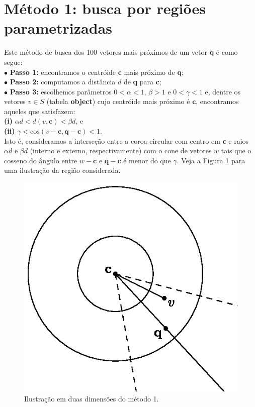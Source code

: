 \documentclass[a4paper,12pt,titlepage]{scrartcl}
\begin{document}
\section{Método 1: busca por regiões parametrizadas}

Este método de busca dos 100 vetores mais próximos de um vetor \textbf{q} é como segue:\\

\noindent$\bullet$ \textbf{Passo 1:} encontramos o centróide \textbf{c} mais próximo de \textbf{q};\\

\noindent$\bullet$ \textbf{Passo 2:} computamos a distância $d$ de \textbf{q} para \textbf{c};\\

\noindent$\bullet$ \textbf{Passo 3:} escolhemos parâmetros $0 < \alpha < 1$, $\beta > 1$ e $0 < \gamma < 1$ e, dentre os vetores $v \in S$ (tabela \textbf{object}) cujo centróide mais próximo é \textbf{c}, encontramos aqueles que satisfazem:\\

\noindent\textbf{(i)} $\alpha d < d(v,\mathbf{c}) < \beta d$, e \\

\noindent\textbf{(ii)} $\gamma < \mathrm{cos}(v-\mathbf{c},\mathbf{q}-\mathbf{c}) < 1$.\\

Isto é, consideramos a interseção entre a coroa circular com centro em \textbf{c} e raios $\alpha d$ e $\beta d$ (interno e externo, respectivamente) com o cone de vetores $w$ tais que o cosseno do ângulo entre $w - \mathbf{c}$ e $\mathbf{q} - \mathbf{c}$ é menor do que $\gamma$. Veja a Figura \ref{figmetodo1} para uma ilustração da região considerada.

\begin{figure}[h]
\centering
\includegraphics{metodo1.eps}
\caption{Ilustração em duas dimensões do método 1.}
\label{figmetodo1}
\end{figure}
\end{document}
